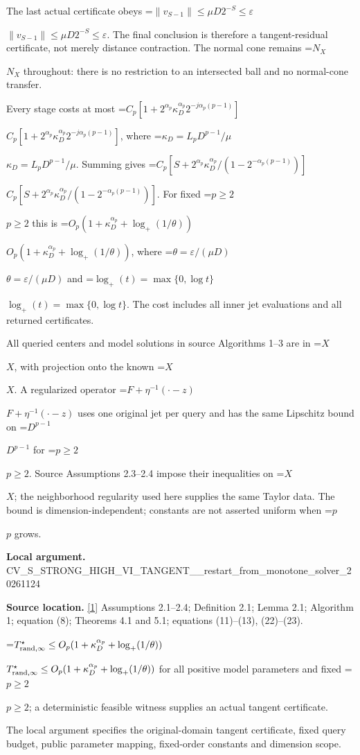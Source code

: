 \documentclass[10pt,a4paper]{article}
\newcommand{\AtlasMath}[1]{\par\begingroup\centering\setbox0=\hbox{$\displaystyle #1$}\ifdim\wd0>1.4\linewidth\typeout{ATLAS WIDE FORMULA: \the\wd0}\fi\ifdim\wd0>\linewidth\resizebox{\linewidth}{!}{\box0}\else\box0\fi\par\endgroup}
\newcommand{\AtlasInlineMath}[1]{\begingroup\setbox0=\hbox{$#1$}\ifdim\wd0>.4\linewidth\endgroup\AtlasMath{#1}\else\endgroup$#1$\fi}
\begin{document}
The last actual certificate obeys \AtlasInlineMath{\|v_{S-1}\|\le\mu D2^{-S}\le\varepsilon}. The final conclusion is therefore a tangent-residual certificate, not merely distance contraction. The normal cone remains \AtlasInlineMath{N_X} throughout: there is no restriction to an intersected ball and no normal-cone transfer.

Every stage costs at most \AtlasInlineMath{C_p[1+2^{\alpha_p}\kappa_D^{\alpha_p}2^{-j\alpha_p(p-1)}]}, where \AtlasInlineMath{\kappa_D=L_pD^{p-1}/\mu}. Summing gives \AtlasInlineMath{C_p[S+2^{\alpha_p}\kappa_D^{\alpha_p}/(1-2^{-\alpha_p(p-1)})]}. For fixed \AtlasInlineMath{p\ge2} this is \AtlasInlineMath{O_p(1+\kappa_D^{\alpha_p}+\log_+(1/\theta))}, where \AtlasInlineMath{\theta=\varepsilon/(\mu D)} and \AtlasInlineMath{\log_+(t)=\max\{0,\log t\}}. The cost includes all inner jet evaluations and all returned certificates.

All queried centers and model solutions in source Algorithms 1--3 are in \AtlasInlineMath{X}, with projection onto the known \AtlasInlineMath{X}. A regularized operator \AtlasInlineMath{F+\eta^{-1}(\cdot-z)} uses one original jet per query and has the same Lipschitz bound on \AtlasInlineMath{D^{p-1}} for \AtlasInlineMath{p\ge2}. Source Assumptions 2.3--2.4 impose their inequalities on \AtlasInlineMath{X}; the neighborhood regularity used here supplies the same Taylor data. The bound is dimension-independent; constants are not asserted uniform when \AtlasInlineMath{p} grows.



\textbf{Local argument.} CV\_S\_STRONG\_HIGH\_VI\_TANG\allowbreak{}ENT\_\_restart\_from\_monoto\allowbreak{}ne\_solver\_20261124



\textbf{Source location.} \href{https://arxiv.org/pdf/2609.23557v1}{[1]} Assumptions 2.1--2.4; Definition 2.1; Lemma 2.1; Algorithm 1; equation (8); Theorems 4.1 and 5.1; equations (11)--(13), (22)--(23).



\AtlasInlineMath{T^\star_{{\rm rand},\infty}\le O_p(1+\kappa_D^{\alpha_p}+\log_+(1/\theta))} for all positive model parameters and fixed \AtlasInlineMath{p\ge2}; a deterministic feasible witness supplies an actual tangent certificate.



The local argument specifies the original-domain tangent certificate, fixed query budget, public parameter mapping, fixed-order constants and dimension scope.
\end{document}
